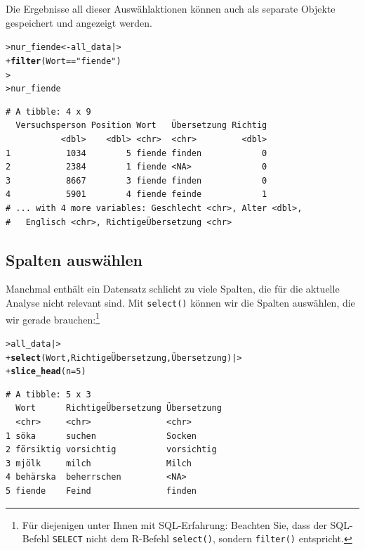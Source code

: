 \documentclass[oneside, 10pt]{book}\usepackage[]{graphicx}\usepackage[]{xcolor}
\makeatletter
\newcommand{\hlnum}[1]{\textcolor[rgb]{0.686,0.059,0.569}{#1}}%
\newcommand{\hlstr}[1]{\textcolor[rgb]{0.192,0.494,0.8}{#1}}%
\newcommand{\hlopt}[1]{\textcolor[rgb]{0,0,0}{#1}}%
\newcommand{\hlstd}[1]{\textcolor[rgb]{0.345,0.345,0.345}{#1}}%
\newcommand{\hlkwb}[1]{\textcolor[rgb]{0.69,0.353,0.396}{#1}}%
\newcommand{\hlkwc}[1]{\textcolor[rgb]{0.333,0.667,0.333}{#1}}%
\newcommand{\hlkwd}[1]{\textcolor[rgb]{0.737,0.353,0.396}{\textbf{#1}}}%
\newenvironment{kframe}{%
 \def\at@end@of@kframe{}%
 \ifinner\ifhmode%
  \def\at@end@of@kframe{\end{minipage}}%
  \begin{minipage}{\columnwidth}%
 \fi\fi%
 \def\FrameCommand##1{\hskip\@totalleftmargin \hskip-\fboxsep
 \colorbox{shadecolor}{##1}\hskip-\fboxsep
     \hskip-\linewidth \hskip-\@totalleftmargin \hskip\columnwidth}%
 \MakeFramed {\advance\hsize-\width
   \@totalleftmargin\z@ \linewidth\hsize
   \@setminipage}}%
 {\par\unskip\endMakeFramed%
 \at@end@of@kframe}
\newenvironment{knitrout}{}{} %
\makeatother
\begin{document}
Die Ergebnisse all dieser Auswählaktionen
können auch als separate Objekte gespeichert und angezeigt werden.
\begin{knitrout}
\color{fgcolor}\begin{kframe}
\begin{alltt}
\hlstd{> }\hlstd{nur_fiende} \hlkwb{<-} \hlstd{all_data |>}
\hlstd{+ }  \hlkwd{filter}\hlstd{(Wort} \hlopt{==} \hlstr{"fiende"}\hlstd{)}
\hlstd{> }
\hlstd{> }\hlstd{nur_fiende}
\end{alltt}
\begin{verbatim}
# A tibble: 4 x 9
  Versuchsperson Position Wort   Übersetzung Richtig
           <dbl>    <dbl> <chr>  <chr>         <dbl>
1           1034        5 fiende finden            0
2           2384        1 fiende <NA>              0
3           8667        3 fiende finden            0
4           5901        4 fiende feinde            1
# ... with 4 more variables: Geschlecht <chr>, Alter <dbl>,
#   Englisch <chr>, RichtigeÜbersetzung <chr>
\end{verbatim}
\end{kframe}
\end{knitrout}

\subsection{Spalten auswählen}
Manchmal enthält ein Datensatz schlicht zu viele Spalten, die
für die aktuelle Analyse nicht relevant sind. Mit \texttt{select()}
können wir die Spalten auswählen, die wir gerade brauchen:\footnote{Für diejenigen unter Ihnen mit SQL-Erfahrung: Beachten Sie, dass
der SQL-Befehl \texttt{SELECT} nicht dem R-Befehl \texttt{select()}, sondern \texttt{filter()} entspricht.}
\begin{knitrout}
\color{fgcolor}\begin{kframe}
\begin{alltt}
\hlstd{> }\hlstd{all_data |>}
\hlstd{+ }  \hlkwd{select}\hlstd{(Wort, RichtigeÜbersetzung, Übersetzung) |>}
\hlstd{+ }  \hlkwd{slice_head}\hlstd{(}\hlkwc{n} \hlstd{=} \hlnum{5}\hlstd{)}
\end{alltt}
\begin{verbatim}
# A tibble: 5 x 3
  Wort      RichtigeÜbersetzung Übersetzung
  <chr>     <chr>               <chr>      
1 söka      suchen              Socken     
2 försiktig vorsichtig          vorsichtig 
3 mjölk     milch               Milch      
4 behärska  beherrschen         <NA>       
5 fiende    Feind               finden     
\end{verbatim}
\end{kframe}
\end{knitrout}
\end{document}
